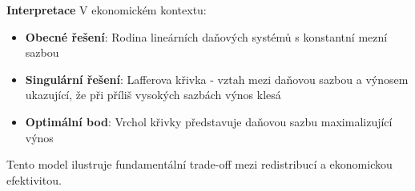 \begin{example}
\vspace{1.5\baselineskip}

\noindent\textbf{Interpretace}
V ekonomickém kontextu:
\begin{itemize}
\item \textbf{Obecné řešení}: Rodina lineárních daňových systémů s konstantní mezní sazbou
\item \textbf{Singulární řešení}: Lafferova křivka - vztah mezi daňovou sazbou a výnosem ukazující, že při příliš vysokých sazbách výnos klesá
\item \textbf{Optimální bod}: Vrchol křivky představuje daňovou sazbu maximalizující výnos
\end{itemize}
Tento model ilustruje fundamentální trade-off mezi redistribucí a ekonomickou efektivitou.

\end{example}

